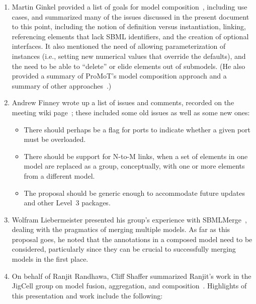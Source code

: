 \begin{enumerate}

\item Martin Ginkel provided a list of goals for model
  composition~\cite{x}, including use cases, and summarized many of the
  issues discussed in the present document to this point, including the
  notion of definition versus instantiation, linking, referencing
  elements that lack SBML identifiers, and the creation of optional
  interfaces.  It also mentioned the need of allowing parameterization
  of instances (i.e., setting new numerical values that override the
  defaults), and the need to be able to ``delete'' or elide elements out
  of submodels.  (He also provided a summary of ProMoT's model
  composition approach and a summary of other approaches~\cite{x}.)

\item Andrew Finney wrote up a list of issues and comments, recorded
  on the meeting wiki page~\cite{x}; these included some old issues as
  well as some new ones:

  \begin{itemize}

  \item There should perhaps be a flag for ports to indicate whether a
    given port must be overloaded.

  \item There should be support for N-to-M links, when a set of elements
    in one model are replaced as a group, conceptually, with one or more
    elements from a different model.
    
  \item The proposal should be generic enough to accommodate future
    updates and other Level~3 packages.

  \end{itemize}
  
  \item Wolfram Liebermeister presented his group's experience with
    SBMLMerge~\cite{x}, dealing with the pragmatics of merging multiple
    models.  As far as this proposal goes, he noted that the annotations
    in a composed model need to be considered, particularly since they
    can be crucial to successfully merging models in the first place.

  \item On behalf of Ranjit Randhawa, Cliff Shaffer summarized Ranjit's
    work in the JigCell group on model fusion, aggregation, and
    composition~\cite{x}.  Highlights of this presentation and work
    include the following:


\end{enumerate}
